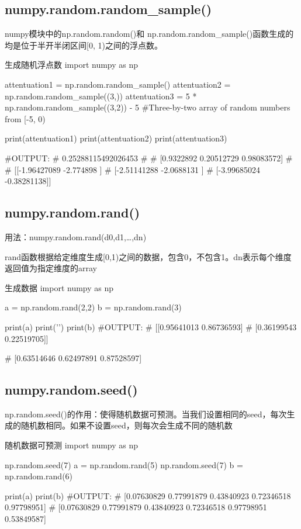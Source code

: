 \documentclass[11pt]{article}
\begin{document}
\subsection{numpy.random.random\_sample()}
numpy模块中的np.random.random()和 np.random.random\_sample()函数生成的均是位于半开半闭区间[0, 1)之间的浮点数。
\begin{Python}{生成随机浮点数}
import numpy as np

attentuation1 = np.random.random_sample()
attentuation2 = np.random.random_sample((3,))
attentuation3 = 5 * np.random.random_sample((3,2)) - 5	#Three-by-two array of random numbers from [-5, 0)

print(attentuation1)
print(attentuation2)
print(attentuation3)

#OUTPUT:
#       0.25288115492026453
#
#       [0.9322892  0.20512729 0.98083572]
#
#       [[-1.96427089 -2.774898  ]
#        [-2.51141288 -2.0688131 ]
#        [-3.99685024 -0.38281138]]
\end{Python}
\subsection{numpy.random.rand()}
用法：numpy.random.rand(d0,d1,…,dn)

rand函数根据给定维度生成[0,1)之间的数据，包含0，不包含1。dn表示每个维度
返回值为指定维度的array
\begin{Python}{生成数据}
import numpy as np

a = np.random.rand(2,2)
b = np.random.rand(3)

print(a)
print('\n')
print(b)
#OUTPUT:
#       [[0.95641013 0.86736593]
#        [0.36199543 0.22519705]]

#       [0.63514646 0.62497891 0.87528597]
\end{Python}
\subsection{numpy.random.seed()}
np.random.seed()的作用：使得随机数据可预测。当我们设置相同的seed，每次生成的随机数相同。如果不设置seed，则每次会生成不同的随机数
\begin{Python}{随机数据可预测}
import numpy as np

np.random.seed(7)
a = np.random.rand(5)
np.random.seed(7)
b = np.random.rand(6)

print(a)
print(b)
#OUTPUT:
#       [0.07630829 0.77991879 0.43840923 0.72346518 0.97798951]
#       [0.07630829 0.77991879 0.43840923 0.72346518 0.97798951 0.53849587]
\end{Python}
\end{document}
